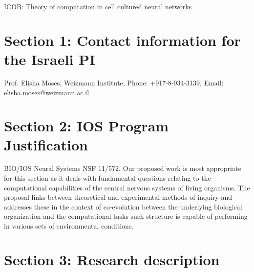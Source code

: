 \begin{center}
ICOB: Theory of computation in cell cultured neural networks
\end{center}
\section{Section 1: Contact information for the Israeli PI}
\noindent Prof. Elisha Moses, Weizmann Institute, Phone: +917-8-934-3139, Email: elisha.moses@weizmann.ac.il

\section{Section 2: IOS Program Justification}
\label{sec:justification}
\noindent BIO/IOS Neural Systems NSF 11/572.
Our proposed work is most appropriate for this section as it deals with fundamental questions relating to the computational capabilities of the central nervous systems of living organisms. The proposal links between theoretical and experimental methods of inquiry and addresses these in the context of co-evolution between the underlying biological organization and the computational tasks such structure is capable of performing in various sets of environmental conditions.

\section{Section 3: Research description}
\label{sec:description}

